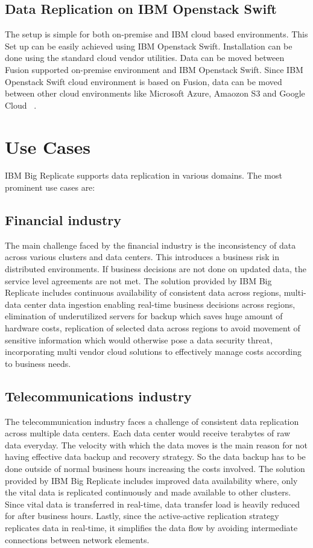 \subsection{Data Replication on IBM Openstack Swift}
The setup is simple for both on-premise and IBM cloud based environments. This
Set up can be easily achieved using IBM Openstack Swift. Installation can be 
done using the standard cloud vendor utilities. Data can be moved between Fusion
supported on-premise environment and IBM Openstack Swift. Since IBM Openstack
Swift cloud environment is based on Fusion, data can be moved between other
cloud environments like Microsoft Azure, Amaozon S3 and Google Cloud
~\cite{hid-sp18-408-IBMBigReplicate-features}.

\section{Use Cases}
IBM Big Replicate supports data replication in various domains. The most 
prominent use cases are:

\subsection{Financial industry}
The main challenge faced by the financial industry is the inconsistency of data
across various clusters and data centers. This introduces a business risk in 
distributed environments. If business decisions are not done on updated data,
the service level agreements are not met. The solution provided by IBM Big
Replicate includes continuous availability of consistent data across regions, 
multi-data center data ingestion enabling real-time business decisions across
regions, elimination of underutilized servers for backup which saves huge amount
of hardware costs, replication of selected data across regions to avoid movement
of sensitive information which would otherwise pose a data security threat, 
incorporating multi vendor cloud solutions to effectively manage costs according
to business needs.

\subsection{Telecommunications industry}
The telecommunication industry faces a challenge of consistent data replication
across multiple data centers. Each data center would receive terabytes of raw
data everyday. The velocity with which the data moves is the main reason for not
having effective data backup and recovery strategy. So the data backup has to be
done outside of normal business hours increasing the costs involved. The
solution provided by IBM Big Replicate includes improved data availability 
where, only the vital data is replicated continuously and made available to
other clusters. Since vital data is transferred in real-time, data transfer load
is heavily reduced for after business hours. Lastly, since the active-active
replication strategy replicates data in real-time, it simplifies the data flow
by avoiding intermediate connections between network elements.

